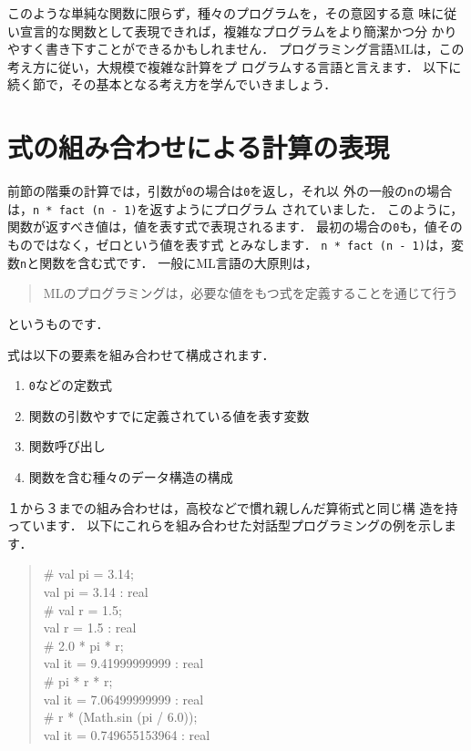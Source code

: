 \documentclass{jbook}
\begin{document}
	このような単純な関数に限らず，種々のプログラムを，その意図する意
味に従い宣言的な関数として表現できれば，複雑なプログラムをより簡潔かつ分
かりやすく書き下すことができるかもしれません．
	プログラミング言語MLは，この考え方に従い，大規模で複雑な計算をプ
ログラムする言語と言えます．
	以下に続く節で，その基本となる考え方を学んでいきましょう．

\section{式の組み合わせによる計算の表現}
\label{sec:tutorialExpression}

	前節の階乗の計算では，引数が{\tt 0}の場合は{\tt 0}を返し，それ以
外の一般の{\tt n}の場合は，{\tt n * fact (n - 1)}を返すようにプログラム
されていました．
	このように，関数が返すべき値は，値を表す式で表現されるます．
	最初の場合の{\tt 0}も，値そのものではなく，ゼロという値を表す式
とみなします．
	{\tt n * fact (n - 1)}は，変数{\tt n}と関数を含む式です．
	一般にML言語の大原則は，
\begin{quote}
MLのプログラミングは，必要な値をもつ式を定義することを通じて行う
\end{quote}
というものです．
	
	式は以下の要素を組み合わせて構成されます．
\begin{enumerate}
\item {\tt 0}などの定数式
\item 関数の引数やすでに定義されている値を表す変数
\item 関数呼び出し
\item 関数を含む種々のデータ構造の構成
\end{enumerate}
	１から３までの組み合わせは，高校などで慣れ親しんだ算術式と同じ構
造を持っています．
	以下にこれらを組み合わせた対話型プログラミングの例を示します．
\begin{tt}
\begin{quote}
\# val pi = 3.14;\\
val pi = 3.14 : real\\
\# val r = 1.5;\\
val r = 1.5 : real\\
\# 2.0 * pi * r;\\
val it = 9.41999999999 : real\\
\# pi * r * r;\\
val it = 7.06499999999 : real\\
\# r * (Math.sin (pi / 6.0));\\
val it = 0.749655153964 : real
\end{quote}
\end{tt}
\end{document}
